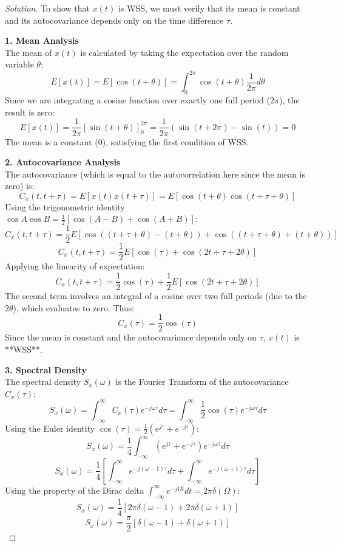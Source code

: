 \documentclass{article}
\begin{document}
\begin{proof}[Solution]
	To show that $x(t)$ is WSS, we must verify that its mean is constant and its autocovariance depends only on the time difference $\tau$.
	
	\textbf{1. Mean Analysis}\\
	The mean of $x(t)$ is calculated by taking the expectation over the random variable $\theta$:
	\[ E[x(t)] = E[\cos(t + \theta)] = \int_{0}^{2\pi} \cos(t + \theta) \frac{1}{2\pi} d\theta \]
	Since we are integrating a cosine function over exactly one full period ($2\pi$), the result is zero:
	\[ E[x(t)] = \frac{1}{2\pi} [\sin(t + \theta)]_{0}^{2\pi} = \frac{1}{2\pi} (\sin(t+2\pi) - \sin(t)) = 0 \]
	The mean is a constant ($0$), satisfying the first condition of WSS.
	
	\textbf{2. Autocovariance Analysis}\\
	The autocovariance (which is equal to the autocorrelation here since the mean is zero) is:
	\[ C_x(t, t+\tau) = E[x(t)x(t+\tau)] = E[\cos(t + \theta) \cos(t + \tau + \theta)] \]
	Using the trigonometric identity $\cos A \cos B = \frac{1}{2}[\cos(A-B) + \cos(A+B)]$:
	\[ C_x(t, t+\tau) = \frac{1}{2} E[\cos((t+\tau+\theta) - (t+\theta)) + \cos((t+\tau+\theta) + (t+\theta))] \]
	\[ C_x(t, t+\tau) = \frac{1}{2} E[\cos(\tau) + \cos(2t + \tau + 2\theta)] \]
	Applying the linearity of expectation:
	\[ C_x(t, t+\tau) = \frac{1}{2} \cos(\tau) + \frac{1}{2} E[\cos(2t + \tau + 2\theta)] \]
	The second term involves an integral of a cosine over two full periods (due to the $2\theta$), which evaluates to zero. Thus:
	\[ C_x(\tau) = \frac{1}{2} \cos(\tau) \]
	Since the mean is constant and the autocovariance depends only on $\tau$, $x(t)$ is **WSS**.
	
	\textbf{3. Spectral Density}\\
	The spectral density $S_x(\omega)$ is the Fourier Transform of the autocovariance $C_x(\tau)$:
	\[ S_x(\omega) = \int_{-\infty}^{\infty} C_x(\tau) e^{-j\omega \tau} d\tau = \int_{-\infty}^{\infty} \frac{1}{2} \cos(\tau) e^{-j\omega \tau} d\tau \]
	Using the Euler identity $\cos(\tau) = \frac{1}{2}(e^{j\tau} + e^{-j\tau})$:
	\[ S_x(\omega) = \frac{1}{4} \int_{-\infty}^{\infty} (e^{j\tau} + e^{-j\tau}) e^{-j\omega \tau} d\tau \]
	\[ S_x(\omega) = \frac{1}{4} \left[ \int_{-\infty}^{\infty} e^{-j(\omega-1)\tau} d\tau + \int_{-\infty}^{\infty} e^{-j(\omega+1)\tau} d\tau \right] \]
	Using the property of the Dirac delta $\int_{-\infty}^{\infty} e^{-j\Omega t} dt = 2\pi \delta(\Omega)$:
	\[ S_x(\omega) = \frac{1}{4} [2\pi \delta(\omega - 1) + 2\pi \delta(\omega + 1)] \]
	\[ S_x(\omega) = \frac{\pi}{2} [\delta(\omega - 1) + \delta(\omega + 1)] \]
\end{proof}
\end{document}
